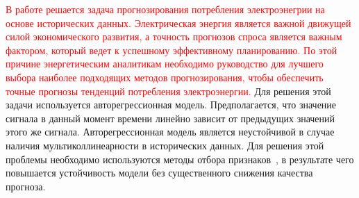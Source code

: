 \documentclass[12pt,twoside]{article}
\begin{document}

\textcolor{red}{В работе решается задача прогнозирования потребления электроэнегрии на основе исторических данных. 
Электрическая энергия является важной движущей силой экономического развития, а точность прогнозов спроса является важным фактором, который ведет к успешному эффективному планированию. 
По этой причине энергетическим аналитикам необходимо руководство для лучшего выбора наиболее подходящих методов прогнозирования, чтобы обеспечить точные прогнозы тенденций потребления электроэнергии.}
Для решения этой задачи используется авторегрессионная модель. Предполагается, что значение сигнала в данный момент времени линейно зависит от предыдущих значений этого же сигнала. 
Авторегрессионная модель является неустойчивой в случае наличия мультиколлинеарности в исторических данных. 
Для решения этой проблемы необходимо используются методы отбора признаков~\cite{Li2016}, в результате чего повышается устойчивость модели без существенного снижения качества прогноза.
\end{document}
